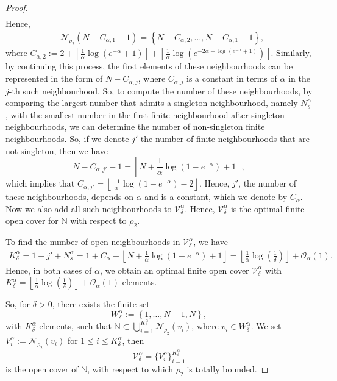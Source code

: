 \documentclass[10pt,a4paper]{amsart}
\def\N{\ensuremath{\mathbb N}}
\begin{document}
\begin{proof}
\begin{align*}
\end{align*}
Hence,
\begin{align*}
&\mathcal{N}_{\rho_2}\left(N-C_{\alpha,1}-1\right) =\left\{  N-C_{\alpha,2},\ldots,N-C_{\alpha,1}-1 \right\},\end{align*}
where $C_{\alpha,2}:= 2+\left\lfloor\frac{1}{\alpha}\log\left(e^{-\alpha}+1\right)\right\rfloor+ \left\lfloor\frac{1}{\alpha}\log \left(e^{-2\alpha-\log\left(e^{-\alpha}+1\right)}\right)\right\rfloor$. Similarly, by continuing this process, the first elements of these neighbourhoods can be represented in the form of $N-C_{\alpha,j}$, where $C_{\alpha,j}$ is a constant in terms of $\alpha$ in the $j$-th such neighbourhood. So, to compute the number of these neighbourhoods, by comparing the largest number that admits a singleton neighbourhood, namely $N_s^{\alpha}$, with the smallest number in the first finite neighbourhood after singleton neighbourhoods, we can determine the number of non-singleton finite neighbourhoods. So, if we denote $j'$ the number of finite neighbourhoods that are not singleton, then we have
$$N-C_{\alpha,j'}-1= \left\lfloor N+\frac{1}{\alpha}\log(1-e^{-\alpha}) +1\right\rfloor,$$
which implies that $C_{\alpha,j'}=\left\lfloor\frac{-1}{\alpha}\log(1-e^{-\alpha})-2\right\rfloor$. Hence, $j'$, the number of these neighbourhoods, depends on $\alpha$ and is a constant, which we denote by $C_{\alpha}$. Now we also add all such neighbourhoods to $\mathcal{V}_\delta^{\alpha}$. Hence, $\mathcal{V}_\delta^{\alpha}$ is the optimal finite open cover for $\N$ with respect to ${\rho_2}$.


To find the number of open neighbourhoods in $\mathcal{V}_\delta^{\alpha}$, we have
\begin{align*}
K_\delta^{\alpha}=1+j'+N_s^{\alpha}=1+C_\alpha+ \left\lfloor N+\frac{1}{\alpha}\log(1-e^{-\alpha}) +1\right\rfloor= \left\lfloor \frac{1}{\alpha} \log \left(\frac{1}{\delta}\right)\right\rfloor+\mathcal{O}_\alpha(1).
\end{align*}
Hence, in both cases of $\alpha$, we obtain an optimal finite open cover $\mathcal{V}_\delta^{\alpha}$ with $K_\delta^{\alpha}= \left\lfloor \frac{1}{\alpha} \log \left(\frac{1}{\delta}\right)\right\rfloor+\mathcal{O}_\alpha(1)$ elements.

So, for $\delta>0$, there exists the finite set $$W_\delta^{\alpha}:=\left\{1,\ldots,N-1,N\right\},$$ with $K_\delta^{\alpha}$ elements, such that $\N\subset\bigcup_{i=1}^{K_\delta^{\alpha}}\mathcal{N}_{\rho_2}(v_i)$, where $v_i\in W_\delta^{\alpha}$. We set $V_i^{\alpha}:=\mathcal{N}_{\rho_2}(v_i)$ for $1\le i\le K_\delta^{\alpha} $, then \begin{equation}\label{Def:V_delta d_2+}
    \mathcal{V}_\delta^{\alpha}=\{V_i^{\alpha}\}_{i=1}^{K_\delta^{\alpha}}
\end{equation} is the open cover of $\N$, with respect to which ${\rho_2}$ is totally bounded.


\end{proof}
\end{document}
